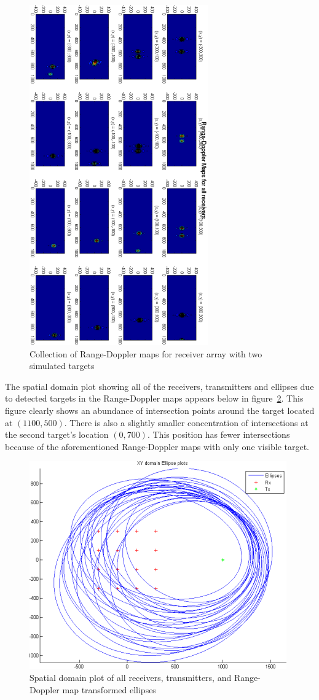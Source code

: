 \documentclass[12pt,openany,a4paper]{book}
\begin{document}
\begin{figure}[p]
\centering
\includegraphics{rdbig2.png}
\caption{Collection of Range-Doppler maps for receiver array with two simulated targets}
\label{fig:rdbig}
\end{figure}

\bigskip

The spatial domain plot showing all of the receivers, transmitters and ellipses due to detected targets in the Range-Doppler maps appears below in figure~\ref{fig:xyell}. This figure clearly shows an abundance of intersection points around the target located at $(1100,500)$. There is also a slightly smaller concentration of intersections at the second target's location $(0,700)$. This position has fewer intersections because of the aforementioned Range-Doppler maps with only one visible target. 

\begin{figure}[p]
\centering
\includegraphics{xyell6.png}
\caption{Spatial domain plot of all receivers, transmitters, and Range-Doppler map transformed ellipses}
\label{fig:xyell}
\end{figure}
\end{document}
